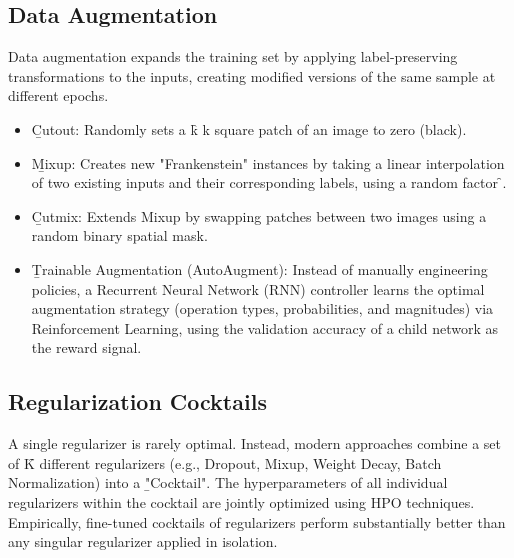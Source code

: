 \subsection{Data Augmentation}
Data augmentation expands the training set by applying label-preserving transformations to the inputs, creating modified versions of the same sample at different epochs.
\begin{itemize}
\item \b{Cutout}: Randomly sets a \f{k \times k} square patch of an image to zero (black).
\item \b{Mixup}: Creates new "Frankenstein" instances by taking a linear interpolation of two existing inputs and their corresponding labels, using a random factor \f{\lambda \in [0, 1]}.
\item \b{Cutmix}: Extends Mixup by swapping patches between two images using a random binary spatial mask.
\item \b{Trainable Augmentation (AutoAugment)}: Instead of manually engineering policies, a Recurrent Neural Network (RNN) controller learns the optimal augmentation strategy (operation types, probabilities, and magnitudes) via Reinforcement Learning, using the validation accuracy of a child network as the reward signal.
\end{itemize}





\subsection{Regularization Cocktails}
A single regularizer is rarely optimal. Instead, modern approaches combine a set of \f{K} different regularizers (e.g., Dropout, Mixup, Weight Decay, Batch Normalization) into a \b{"Cocktail"}. The hyperparameters of all individual regularizers within the cocktail are jointly optimized using HPO techniques.\\[.5em]
Empirically, fine-tuned cocktails of regularizers perform substantially better than any singular regularizer applied in isolation.


